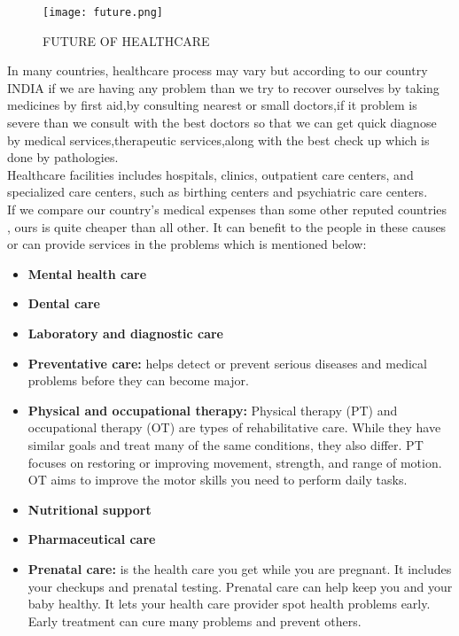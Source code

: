\documentclass[12pts]{article}
\begin{document}
\begin{figure}[h]
\centering
\texttt{[image: future.png]}
\caption{FUTURE OF HEALTHCARE}
\end{figure}
In many countries, healthcare process may vary but according to our country INDIA if we are having any problem than we try to recover ourselves by taking medicines by first aid,by consulting nearest or small doctors,if it problem is severe than we consult with the best doctors so that we can get quick diagnose by medical services,therapeutic services,along with the best check up which is done by pathologies.\\
Healthcare facilities includes hospitals, clinics, outpatient care centers, and specialized care centers, such as birthing centers and psychiatric care centers.\\
If we compare our country's medical expenses than some other reputed countries , ours is quite cheaper than all other.
It can benefit to the people in these causes or can provide services in the problems which is mentioned below:\\

\begin{itemize}
\item \textbf{Mental health care}
\item \textbf{Dental care}
\item  \textbf{Laboratory and diagnostic care}
\item  \textbf{Preventative care:} helps detect or prevent serious diseases and medical problems before they can become major.
\item  \textbf{Physical and occupational therapy:} Physical therapy (PT) and occupational therapy (OT) are types of rehabilitative care. While they have similar goals and treat many of the same conditions, they also differ. PT focuses on restoring or improving movement, strength, and range of motion. OT aims to improve the motor skills you need to perform daily tasks.
\item \textbf{ Nutritional support}
\item  \textbf{Pharmaceutical care}
\item  \textbf{Prenatal care: } is the health care you get while you are pregnant. It includes your checkups and prenatal testing. Prenatal care can help keep you and your baby healthy. It lets your health care provider spot health problems early. Early treatment can cure many problems and prevent others.
\end{itemize}
\end{document}
